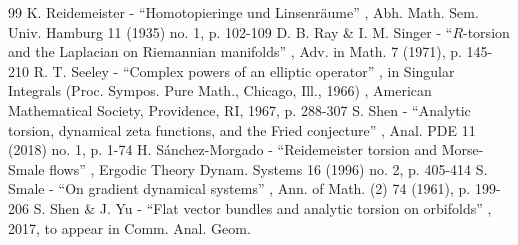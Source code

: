 \documentclass[11pt]{article}
\numberwithin{equation}{section}
\theoremstyle{plain}
\theoremstyle{definition}
\theoremstyle{remark}
\begin{document}
\begin{thebibliography}{99}
 K. Reidemeister - “Homotopieringe und Linsenräume” , Abh. Math. Sem. Univ. Hamburg 11 (1935) no. 1, p. 102-109
 D. B. Ray \& I. M. Singer - “$R$-torsion and the Laplacian on Riemannian manifolds” , Adv. in Math. 7 (1971), p. 145-210
 R. T. Seeley - “Complex powers of an elliptic operator” , in Singular Integrals (Proc. Sympos. Pure Math., Chicago, Ill., 1966) , American Mathematical Society, Providence, RI, 1967, p. 288-307
 S. Shen - “Analytic torsion, dynamical zeta functions, and the Fried conjecture” , Anal. PDE 11 (2018) no. 1, p. 1-74
 H. Sánchez-Morgado - “Reidemeister torsion and Morse-Smale flows” , Ergodic Theory Dynam. Systems 16 (1996) no. 2, p. 405-414
 S. Smale - “On gradient dynamical systems” , Ann. of Math. (2) 74 (1961), p. 199-206
 S. Shen \& J. Yu - “Flat vector bundles and analytic torsion on orbifolds” , 2017, to appear in Comm. Anal. Geom.
\end{thebibliography}
\end{document}
